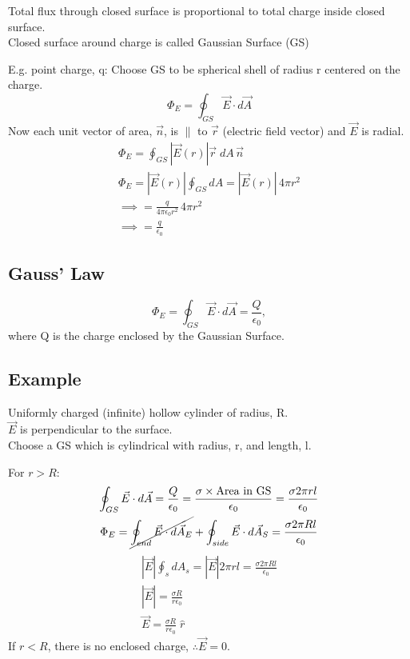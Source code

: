 \documentclass[a4paper, 11pt, fleqn, normalem]{report}
\begin{document}
Total flux through closed surface is proportional to total charge inside closed surface. \\
Closed surface around charge is called Gaussian Surface (GS)

E.g. point charge, q: Choose GS to be spherical shell of radius r centered on the charge.
\begin{equation*}
    \Phi_{E} = \oint_{GS} \vec{E} \cdot d\vec{A}
\end{equation*}
Now each unit vector of area, $\vec{n}$, is $\parallel$ to $\vec{r}$ (electric field vector) and $\vec{E}$ is radial.
\begin{gather*}
    \Phi_{E} = \oint_{GS} |\vec{E}(r)| \vec{r} \; dA \, \vec{n} \\
    \Phi_{E} = |\vec{E}(r)| \oint_{GS} dA = |\vec{E}(r)|\, 4\pi r^{2} \\
    \implies = \frac{q}{4\pi\epsilon_{0}r^{2}}\, 4\pi r^{2} \\
    \implies = \frac{q}{\epsilon_{0}}
\end{gather*}

\subsection{Gauss' Law}
\begin{equation*}
    \Phi_{E} = \oint_{GS} \vec{E} \cdot d\vec{A} = \frac{Q}{\epsilon_{0}},
\end{equation*}
where Q is the charge enclosed by the Gaussian Surface.

\subsection{Example}
Uniformly charged (infinite) hollow cylinder of radius, R. \\
$\vec{E}$ is perpendicular to the surface. \\
Choose a GS which is cylindrical with radius, r, and length, l.

For $r > R$:
\begin{gather*}
    \oint_{GS} \vec{E} \cdot d\vec{A} = \frac{Q}{\epsilon_{0}} = \frac{\sigma \times \text{Area in GS}}{\epsilon_{0}} = \frac{\sigma 2\pi r l}{\epsilon_{0}} \\
    \Phi_{E} = \cancel{\oint_{end} \vec{E} \cdot d\vec{A}_{E}} + \oint_{side} \vec{E} \cdot d\vec{A}_{S} = \frac{\sigma 2\pi R l}{\epsilon_{0}}
\end{gather*}
\begin{gather*}
    |\vec{E}| \oint_{s} dA_{s} = |\vec{E}| 2\pi r l = \frac{\sigma 2\pi R l}{\epsilon_{0}} \\
    |\vec{E}| = \frac{\sigma R}{r \epsilon_{0}} \\
    \vec{E} = \frac{\sigma R}{r \epsilon_{0}} \; \hat{r}
\end{gather*}
If $r < R$, there is no enclosed charge, $\therefore \vec{E} = 0$.
\end{document}
